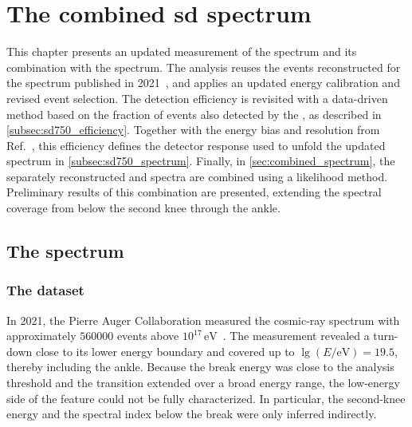 \documentclass[main.tex]{subfiles}
\begin{document}
\chapter{The combined \gls{sd} spectrum}
\label{chapter:sd750_combined_spectrum}

This chapter presents an updated measurement of the  spectrum and its combination with the  spectrum.
The  analysis reuses the events reconstructed for the spectrum published in 2021~\cite{PierreAuger:2021:InfillSpectrum}, and applies an updated energy calibration and revised event selection.
The detection efficiency is revisited with a data-driven method based on the fraction of  events also detected by the , as described in \cref{subsec:sd750_efficiency}.
Together with the energy bias and resolution from Ref.~\cite{PierreAuger:2021:InfillSpectrum}, this efficiency defines the detector response used to unfold the updated  spectrum in \cref{subsec:sd750_spectrum}.
Finally, in \cref{sec:combined_spectrum}, the separately reconstructed  and  spectra are combined using a likelihood method.
Preliminary results of this combination are presented, extending the spectral coverage from below the second knee through the ankle.

\section{The  spectrum}
\label{sec:sd750_spectrum}

\subsection{The  dataset}

In 2021, the Pierre Auger Collaboration measured the cosmic-ray spectrum with approximately $\num{560000}$  events above $10^{17}\,\mathrm{eV}$~\cite{PierreAuger:2021:InfillSpectrum}.
The measurement revealed a turn-down close to its lower energy boundary and covered up to $\lg(E/\mathrm{eV})=19.5$, thereby including the ankle.
Because the break energy was close to the analysis threshold and the transition extended over a broad energy range, the low-energy side of the feature could not be fully characterized.
In particular, the second-knee energy and the spectral index below the break were only inferred indirectly.
\end{document}

